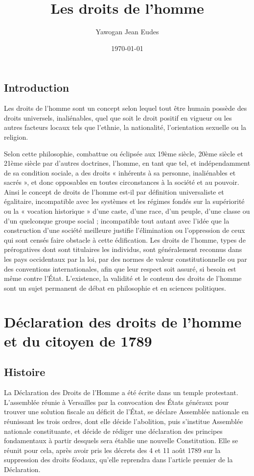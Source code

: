 \documentclass[a4paper,10pt]{book}
\title{Les droits de l'homme}
\author{Yawogan Jean Eudes \bsc{Gbodjo}}
\date{\today}
\begin{document}
\maketitle

\frontmatter
\chapter{\large{Introduction}}
Les droits de l'homme sont un concept selon lequel tout être humain possède des droits universels, inaliénables, quel que soit le droit positif en vigueur ou les autres facteurs locaux tels que l'ethnie, la nationalité, l'orientation sexuelle ou la religion.

Selon cette philosophie, combattue ou éclipsée aux 19ème siècle, 20ème siècle et 21ème siècle par d'autres doctrines, l'homme, en tant que tel, et indépendamment de sa condition sociale, a des droits « inhérents à sa personne, inaliénables et sacrés », et donc opposables en toutes circonstances à la société et au pouvoir. Ainsi le concept de droits de l'homme est-il par définition universaliste et égalitaire, incompatible avec les systèmes et les régimes fondés sur la supériorité ou la « vocation historique » d'une caste, d'une race, d'un peuple, d'une classe ou d'un quelconque groupe social ; incompatible tout autant avec l'idée que la construction d'une société meilleure justifie l'élimination ou l'oppression de ceux qui sont censés faire obstacle à cette édification.
Les droits de l'homme, types de prérogatives dont sont titulaires les individus, sont généralement reconnus dans les pays occidentaux par la loi, par des normes de valeur constitutionnelle ou par des conventions internationales, afin que leur respect soit assuré, si besoin est même contre l'État. L'existence, la validité et le contenu des droits de l'homme sont un sujet permanent de débat en philosophie et en sciences politiques.
\mainmatter
\part{Déclaration des droits de l'homme et du citoyen de 1789}
\chapter{Histoire}
La Déclaration des Droits de l'Homme a été écrite dans un temple protestant. L'assemblée réunie à Versailles par la convocation des États généraux pour trouver une solution fiscale au déficit de l'État, se déclare Assemblée nationale en réunissant les trois ordres, dont elle décide l'abolition, puis s'institue Assemblée nationale constituante, et décide de rédiger une déclaration des principes fondamentaux à partir desquels sera établie une nouvelle Constitution. Elle se réunit pour cela, après avoir pris les décrets des 4 et 11 août 1789 sur la suppression des droits féodaux, qu'elle reprendra dans l'article premier de la Déclaration.
\end{document}
